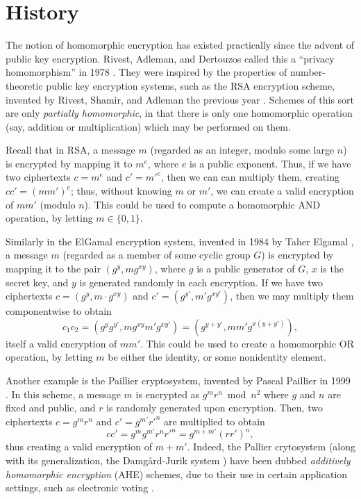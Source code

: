 \section{History}

The notion of homomorphic encryption has existed practically since the advent of public key encryption. Rivest, Adleman, and Dertouzos called this a ``privacy homomorphism'' in 1978 \cite{rivest1978data}. They were inspired by the properties of number-theoretic public key encryption systems, such as the RSA encryption scheme, invented by Rivest, Shamir, and Adleman the previous year \cite{rivest1978method}.
Schemes of this sort are only \emph{partially homomorphic}, in that there is only one homomorphic operation (say, addition or multiplication) which may be performed on them.

Recall that in RSA, a message $m$ (regarded as an integer, modulo some large $n$) is encrypted by mapping it to $m^e$, where $e$ is a public exponent. Thus, if we have two ciphertexts $c = m^e$ and $c' = m'^e$, then we can can multiply them, creating $cc' = (m m')^e$; thus, without knowing $m$ or $m'$, we can create a valid encryption of $m m'$ (modulo $n$). This could be used to compute a homomorphic AND operation, by letting $m \in \{0,1\}$.

Similarly in the ElGamal encryption system, invented in 1984 by Taher Elgamal \cite{elgamal1984public}, a message $m$ (regarded as a member of some cyclic group $G$) is encrypted by mapping it to the pair $(g^y, m  g^{xy})$, where $g$ is a public generator of $G$, $x$ is the secret key, and $y$ is generated randomly in each encryption. If we have two ciphertexts $c = (g^y, m \cdot g^{xy})$ and $c' = (g^{y'}, m'  g^{x y'})$, then we may multiply them componentwise to obtain
\[c_1 c_2 = (g^y g^{y'}, m g^{xy} m' g^{xy'}) = (g^{y + y'}, mm' g^{x (y + y')}),\]
itself a valid encryption of $mm'$. This could be used to create a homomorphic OR operation, by letting $m$ be either the identity, or some nonidentity element.

Another example is the Paillier cryptosystem, invented by Pascal Paillier in 1999 \cite{Paillier1999}. In this scheme, a message $m$ is encrypted as $g^m r^n \bmod n^2$ where $g$ and $n$ are fixed and public, and $r$ is randomly generated upon encryption. Then, two ciphertexts $c = g^m r^n$ and $c' = g^{m'} r'^n$ are multiplied to obtain
\[c c' = g^m g^{m'} r^n r'^n = g^{m + m'} (r r')^n,\]
thus creating a valid encryption of $m + m'$. Indeed, the Pallier crytosystem (along with its generalization, the Damg\aa rd-Jurik system \cite{Damgard}) have been dubbed \emph{additively homomorphic encryption} (AHE) schemes, due to their use in certain application settings, such as electronic voting \cite{Damgard}.

